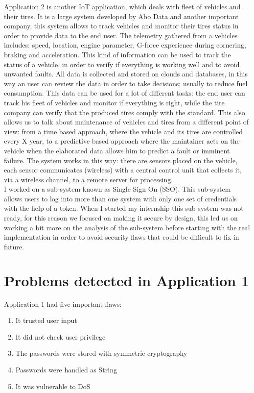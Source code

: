 Application 2 is another IoT application, which deals with fleet of vehicles and their tires. It is a large system developed by Abo Data and another important company, 
this system allows to track vehicles and monitor their tires status in order to provide data to the end user.\newline
The telemetry gathered from a vehicles includes: speed, location, engine parameter, G-force experience during cornering, braking and acceleration.\newline
This kind of information can be used to track the status of a vehicle, in order to verify if everything is working well and to avoid unwanted faults.\newline
All data is collected and stored on clouds and databases, in this way an user can review the data in order to take decisions; usually to reduce fuel consumption.\newline
This data can be used for a lot of different tasks: the end user can track his fleet of vehicles and monitor if everything is right, while the tire company can verify that the produced tires comply with the standard.\newline
This also allows us to talk about maintenance of vehicles and tires from a different point of view: from a time based
approach, where the vehicle and its tires are controlled every X year, to a predictive based approach where the maintainer acts on the vehicle when the elaborated data allows him to predict a fault or imminent failure.\newline
The system works in this way: there are sensors placed on the vehicle, each sensor communicates (wireless) with a central control unit that collects it, via a wireless channel, to a remote server for processing.\\

I worked on a sub-system known as Single Sign On (SSO). This sub-system allows users to log into more than one system
with only one set of credentials with the help of a token.\newline
When I started my internship this sub-system was not ready, for this reason we focused on making it secure by design, this led us on working a bit more on the analysis of the sub-system before starting with the real implementation in order to avoid security flaws that could be difficult to fix in future.\newline


\section{Problems detected in Application 1}
Application 1 had five important flaws:
\begin{enumerate}
	\item It trusted user input
	\item It did not check user privilege
	\item The passwords were stored with symmetric cryptography
	\item Passwords were handled as String
	\item It was vulnerable to DoS
\end{enumerate}

